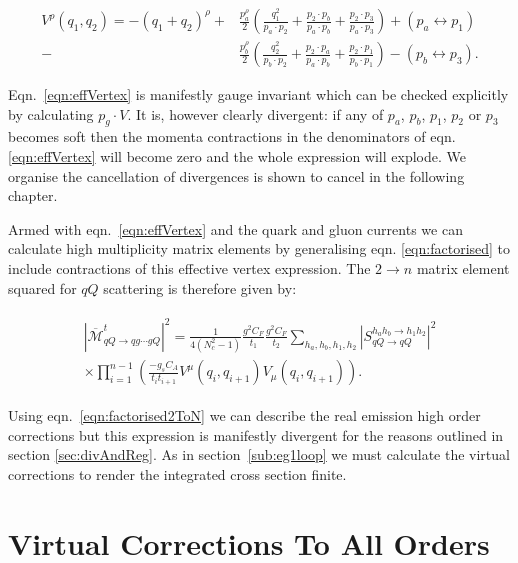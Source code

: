 		\begin{align}
			V^\rho(q_1, q_2) = -(q_1 + q_2)^\rho +
			&\frac{p_a^\rho}{2}\left(\frac{q^2_1}{p_a\cdot p_2} + \frac{p_2 \cdot p_b}{p_a \cdot p_b} + \frac{p_2 \cdot p_3}{p_a \cdot p_3}\right) + (p_a\leftrightarrow p_1) \\
			- &\frac{p_b^\rho}{2}\left(\frac{q^2_2}{p_b\cdot p_2} + \frac{p_2 \cdot p_a}{p_a \cdot p_b} + \frac{p_2 \cdot p_1}{p_b \cdot p_1}\right) - (p_b\leftrightarrow p_3).
			\label{eqn:effVertex}
		\end{align}

		Eqn.~\eqref{eqn:effVertex} is manifestly gauge invariant which can be checked explicitly by
		calculating $p_g\cdot V$.  It is, however clearly divergent:  if any of $p_a$, $p_b$, $p_1$,
		$p_2$ or $p_3$ becomes soft then the momenta contractions in the denominators of eqn.
		\eqref{eqn:effVertex} will become zero and the whole expression will explode.  We organise
		the cancellation of divergences is shown to cancel in the following chapter.

		Armed with eqn.~\eqref{eqn:effVertex} and the quark and gluon
		currents we can calculate high multiplicity matrix elements by generalising eqn.
		\eqref{eqn:factorised} to include contractions of this effective vertex expression.  The
		$2\rightarrow n$ matrix element squared for $qQ$ scattering is therefore given by:

		\begin{align}
		\begin{split}
			|\overline{\mathcal{M}}^t_{qQ\rightarrow qg\cdots gQ}|^2 = \frac{1}{4(N_c^2-1)}
			\frac{g^2C_F}{t_1}\frac{g^2C_F}{t_2} \sum_{h_a, h_b, h_1, h_2}
			|S_{qQ\rightarrow qQ}^{h_ah_b\rightarrow h_1h_2}|^2\\
			\times\prod_{i=1}^{n-1}\left(\frac{-g_sC_A}{t_it_{i+1}}V^\mu(q_i, q_{i+1})V_\mu(q_i, q_{i+1})\right).
			\label{eqn:factorised2ToN}
		\end{split}
		\end{align}

		Using eqn.~\eqref{eqn:factorised2ToN} we can describe the real emission high order
		corrections but this expression is manifestly divergent for the reasons outlined in
		section \ref{sec:divAndReg}.  As in section~\ref{sub:eg1loop} we must calculate the
		virtual corrections to render the integrated cross section finite.

	\section{Virtual Corrections To All Orders}
		\label{sub:virtuals}

